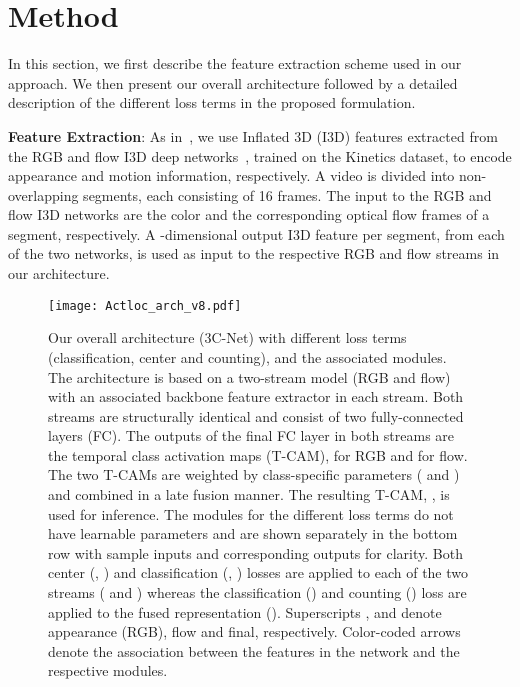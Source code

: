 \documentclass[10pt,twocolumn,letterpaper]{article}
\begin{document}
\section{Method}
In this section, we first describe the feature extraction scheme used in our approach. We then present our overall architecture followed by a detailed description of the different loss terms in the proposed formulation.

\noindent\textbf{Feature Extraction}: As in~\cite{stpn,wtalc}, we use Inflated 3D (I3D) features extracted from the RGB and flow I3D deep networks~\cite{kinetics}, trained on the Kinetics dataset, to encode appearance and motion information, respectively.
A video is divided into non-overlapping segments, each consisting of 16 frames. The input to the RGB and flow I3D networks are the color
and the corresponding optical flow frames of a segment, respectively.
A -dimensional output I3D feature per segment, from each of the two networks, is used as input to the respective RGB and flow streams in our architecture.
\vspace{-0.45cm}
\begin{figure*}[t]
    \centering
    \texttt{[image: Actloc\_arch\_v8.pdf]}
    \vspace{-0.05cm}
    \caption{Our overall architecture (3C-Net) with different loss terms (classification, center and counting), and the associated modules.
    The architecture is based on a two-stream model (RGB and flow) with an associated backbone feature extractor in each stream. Both streams are structurally identical and consist of two fully-connected layers (FC). The outputs of the final FC layer in both streams are the temporal class activation maps (T-CAM),  for RGB and  for flow.
    The two T-CAMs are weighted by class-specific parameters ( and ) and combined in a late fusion manner. The resulting T-CAM, , is used for inference. The modules for the different loss terms do not have learnable parameters and are shown separately in the bottom row with sample inputs and corresponding outputs for clarity.
    Both center (, ) and classification (, ) losses are applied to each of the two streams ( and ) whereas the classification () and counting () loss are applied to the fused representation (). Superscripts ,  and  denote appearance (RGB), flow and final, respectively.
    Color-coded arrows denote the association between the features in the network and the respective modules. 
    }
    \label{fig_overall_arch}\vspace{-0.2cm}
\end{figure*}
\end{document}
